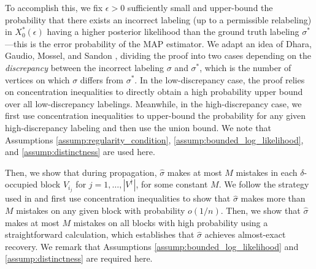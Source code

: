 \documentclass{article}
\newcommand{\1}{\mathbbm{1}}
\theoremstyle{definition}
\theoremstyle{plain}
\begin{document}
To accomplish this, we fix $\epsilon > 0$ sufficiently small and upper-bound the probability that there exists an incorrect labeling (up to a permissible relabeling) in $X_0^*(\epsilon)$ having a higher posterior likelihood than the ground truth labeling $\sigma^*$---this is the error probability of the MAP estimator. We adapt an idea of Dhara, Gaudio, Mossel, and Sandon \cite{Dhara+2024}, dividing the proof into two cases depending on the \textit{discrepancy} between the incorrect labeling $\sigma$ and $\sigma^*$, which is the number of vertices on which $\sigma$ differs from $\sigma^*$. In the low-discrepancy case, the proof relies on concentration inequalities to directly obtain a high probability upper bound over all low-discrepancy labelings. Meanwhile, in the high-discrepancy case, we first use concentration inequalities to upper-bound the probability for any given high-discrepancy labeling and then use the union bound. We note that Assumptions \ref{assump:regularity_condition}, \ref{assump:bounded_log_likelihood}, and \ref{assump:distinctness} are used here.

Then, we show that during propagation, $\hat{\sigma}$ makes at most $M$ mistakes in each $\delta$-occupied block $V_{i_j}$ for $j = 1, \ldots, |V^\dagger|$, for some constant $M$. We follow the strategy used in \cite{Gaudio+2025} and first use concentration inequalities to show that $\hat{\sigma}$ makes more than $M$ mistakes on any given block with probability $o(1/n)$. Then, we show that $\hat{\sigma}$ makes at most $M$ mistakes on all blocks with high probability using a straightforward calculation, which establishes that $\hat{\sigma}$ achieves almost-exact recovery. We remark that Assumptions \ref{assump:bounded_log_likelihood} and \ref{assump:distinctness} are required here.
\end{document}

